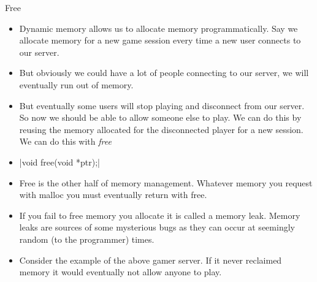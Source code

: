 \documentclass[10pt]{beamer}
\begin{document}
\begin{frame}[fragile]{Free} 
\begin{itemize}[<+->]
	\item Dynamic memory allows us to allocate memory programmatically. Say we allocate memory for a new game session every time a new user connects to our server.
	\item But obviously we could have a lot of people connecting to our server, we will eventually run out of memory.
	\item But eventually some users will stop playing and disconnect from our server. So now we should be able to allow someone else to play. We can do this by reusing the memory allocated for the disconnected player for a new session. We can do this with {\it free}
	\item {}|void free(void *ptr);|
	\item Free is the other half of memory management. Whatever memory you request with malloc you must eventually return with free.
	\item If you fail to free memory you allocate it is called a memory leak. Memory leaks are sources of some mysterious bugs as they can occur at seemingly random (to the programmer) times.
	\item Consider the example of the above gamer server. If it never reclaimed memory it would eventually not allow anyone to play.
\end{itemize}
\end{frame}
\end{document}

